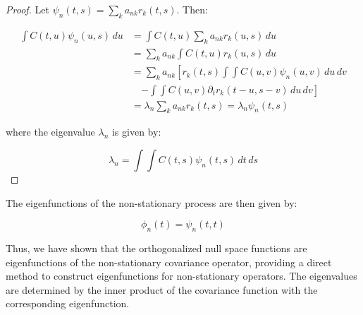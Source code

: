 \documentclass{article}
\begin{document}
\begin{proof}
Let $\psi_n(t,s) = \sum_k a_{nk} r_k(t,s)$. Then:

\begin{align*}
\int C(t,u) \psi_n(u,s) \, du &= \int C(t,u) \sum_k a_{nk} r_k(u,s) \, du \\
&= \sum_k a_{nk} \int C(t,u) r_k(u,s) \, du \\
&= \sum_k a_{nk} \left[r_k(t,s) \int\int C(u,v) \psi_n(u,v) \, du \, dv \right. \\
&\quad \left. - \int\int C(u,v) \partial_t r_k(t-u,s-v) \, du \, dv\right] \\
&= \lambda_n \sum_k a_{nk} r_k(t,s) = \lambda_n \psi_n(t,s)
\end{align*}

where the eigenvalue $\lambda_n$ is given by:

$$\lambda_n = \int\int C(t,s) \psi_n(t,s) \, dt \, ds$$
\end{proof}

The eigenfunctions of the non-stationary process are then given by:

$$\phi_n(t) = \psi_n(t,t)$$

Thus, we have shown that the orthogonalized null space functions are eigenfunctions of the non-stationary covariance operator, providing a direct method to construct eigenfunctions for non-stationary operators. The eigenvalues are determined by the inner product of the covariance function with the corresponding eigenfunction.
\end{document}
